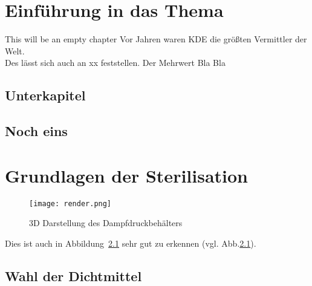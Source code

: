 %
%
%
%
%
%
%


\chapter{Einführung in das Thema}           %



%


This will be an empty chapter
Vor Jahren waren \ac{KDE} die größten Vermittler der Welt. 
\\ %

Des lässt sich auch an xx feststellen. Der Mehrwert Bla Bla \blindtext

\par %
\blindtext{}
\section{Unterkapitel}
\blindtext{}
\section{Noch eins}

\chapter{Grundlagen der Sterilisation}
\blindtext[1] \par

\begin{figure}[htb]
    \centering  
    \texttt{[image: render.png]}
    \caption{3D Darstellung des Dampfdruckbehälters}\label{fig:render}
\end{figure}

\par

Dies ist auch in Abbildung~\ref{fig:render} sehr gut zu erkennen (vgl. Abb.\ref{fig:render}).


\blindtext[2] \par


\section{Wahl der Dichtmittel}
\blindtext[2] \par

